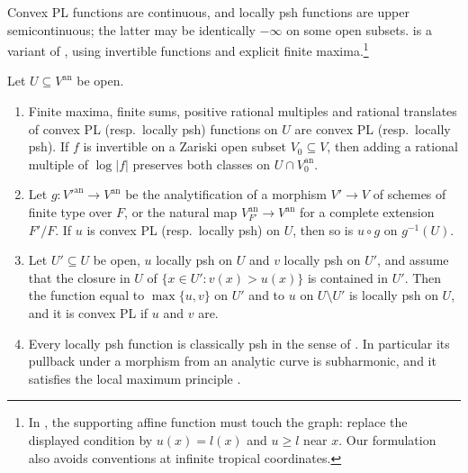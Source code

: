\documentclass[11pt,a4paper]{article}
\newcommand{\an}{\mathrm{an}}          %
\begin{document}
Convex PL functions are continuous, and locally psh functions are upper semicontinuous; the latter may be identically $-\infty$ on some open subsets.  is a variant of \cite[Definitions~3.7 and~3.8]{Wu26}, using invertible functions and explicit finite maxima.\footnote{In \cite[Definition~3.1(3)]{Wu26}, the supporting affine function must touch the graph: replace the displayed condition by $u(x)=l(x)$ and $u\ge l$ near $x$. Our formulation also avoids conventions at infinite tropical coordinates.}

\begin{lemma}\label{lem:local-basic}
Let $U\subseteq V^{\an}$ be open.
\begin{enumerate}
\item Finite maxima, finite sums, positive rational multiples and rational translates of convex PL \textup(resp.\ locally psh\textup) functions on $U$ are convex PL \textup(resp.\ locally psh\textup). If $f$ is invertible on a Zariski open subset $V_0\subseteq V$, then adding a rational multiple of $\log|f|$ preserves both classes on $U\cap V_0^{\an}$.
\item Let $g\colon V'^{\an}\to V^{\an}$ be the analytification of a morphism $V'\to V$ of schemes of finite type over $F$, or the natural map $V_{F'}^{\an}\to V^{\an}$ for a complete extension $F'/F$. If $u$ is convex PL \textup(resp.\ locally psh\textup) on $U$, then so is $u\circ g$ on $g^{-1}(U)$.
\item Let $U'\subseteq U$ be open, $u$ locally psh on $U$ and $v$ locally psh on $U'$, and assume that the closure in $U$ of $\{x\in U':v(x)>u(x)\}$ is contained in $U'$. Then the function equal to $\max\{u,v\}$ on $U'$ and to $u$ on $U\setminus U'$ is locally psh on $U$, and it is convex PL if $u$ and $v$ are.
\item Every locally psh function is classically psh in the sense of \cite[Definition~4.1]{GublerRabinoff25}. In particular its pullback under a morphism from an analytic curve is subharmonic, and it satisfies the local maximum principle \cite[Theorem~6.1]{GublerRabinoff25}.
\end{enumerate}
\end{lemma}
\end{document}
